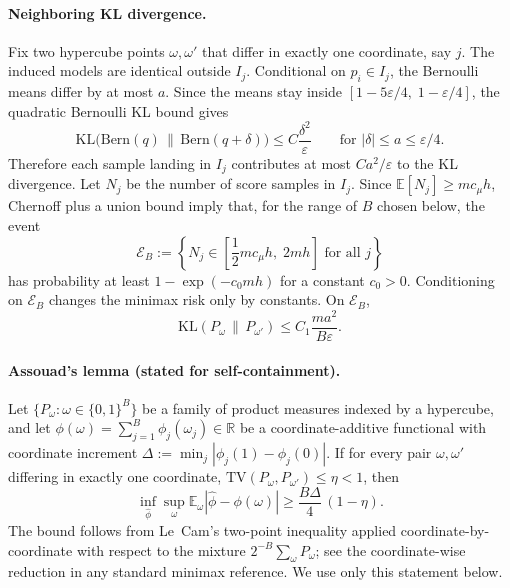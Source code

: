 \documentclass{article}
\newcommand{\errrate}{\varepsilon}
\newcommand{\nsamples}{m}
\newcommand{\scoredist}{\mu}
\providecommand{\E}{}
\renewcommand{\E}{\mathbb{E}}
\providecommand{\KL}{}
\renewcommand{\KL}{\mathrm{KL}}
\newcommand{\TV}{\mathrm{TV}}
\newcommand{\Bern}{\mathrm{Bern}}
\theoremstyle{definition}
\begin{document}
\paragraph{Neighboring KL divergence.} Fix two hypercube points $\omega,\omega'$ that differ in exactly one coordinate, say $j$. The induced models are identical outside $I_j$. Conditional on $p_i \in I_j$, the Bernoulli means differ by at most $a$. Since the means stay inside $[1-5\errrate/4,\;1-\errrate/4]$, the quadratic Bernoulli KL bound gives
\[
\KL\!\big(\Bern(q)\,\|\,\Bern(q+\delta)\big) \le C \frac{\delta^2}{\errrate}
\qquad\text{for } |\delta|\le a \le \errrate/4.
\]
Therefore each sample landing in $I_j$ contributes at most $C a^2/\errrate$ to the KL divergence. Let $N_j$ be the number of score samples in $I_j$. Since $\E[N_j] \ge \nsamples c_\scoredist h$, Chernoff plus a union bound imply that, for the range of $B$ chosen below, the event
\[
\mathcal{E}_B := \left\{ N_j \in \left[\frac{1}{2}\nsamples c_\scoredist h,\; 2\nsamples h\right] \text{ for all } j \right\}
\]
has probability at least $1-\exp(-c_0 \nsamples h)$ for a constant $c_0>0$. Conditioning on $\mathcal{E}_B$ changes the minimax risk only by constants. On $\mathcal{E}_B$,
\begin{equation}
\label{eq:neighbor-kl}
\KL(P_\omega \,\|\, P_{\omega'}) \le C_1 \frac{\nsamples a^2}{B\errrate}.
\end{equation}

\paragraph{Assouad's lemma (stated for self-containment).} Let $\{P_\omega : \omega \in \{0,1\}^B\}$ be a family of product measures indexed by a hypercube, and let $\phi(\omega) = \sum_{j=1}^B \phi_j(\omega_j) \in \mathbb{R}$ be a coordinate-additive functional with coordinate increment $\Delta := \min_j |\phi_j(1) - \phi_j(0)|$. If for every pair $\omega,\omega'$ differing in exactly one coordinate, $\TV(P_\omega, P_{\omega'}) \le \eta < 1$, then
\[
\inf_{\hat\phi} \sup_{\omega} \E_\omega |\hat\phi - \phi(\omega)| \ge \frac{B\Delta}{4}\,(1-\eta).
\]
The bound follows from Le~Cam's two-point inequality applied coordinate-by-coordinate with respect to the mixture $2^{-B}\sum_\omega P_\omega$; see the coordinate-wise reduction in any standard minimax reference. We use only this statement below.
\end{document}
